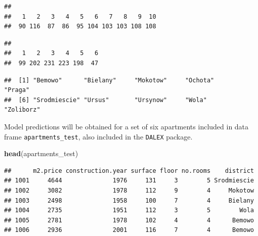 \documentclass[12pt,]{krantz}
\newenvironment{Shaded}{\begin{snugshade}}{\end{snugshade}}
\newcommand{\KeywordTok}[1]{\textcolor[rgb]{0.13,0.29,0.53}{\textbf{#1}}}
\newcommand{\NormalTok}[1]{#1}
\newcommand{\OperatorTok}[1]{\textcolor[rgb]{0.81,0.36,0.00}{\textbf{#1}}}
\theoremstyle{definition}
\theoremstyle{definition}
\theoremstyle{definition}
\theoremstyle{remark}
\begin{document}
\begin{Shaded}
\end{Shaded}

\begin{verbatim}
## 
##   1   2   3   4   5   6   7   8   9  10 
##  90 116  87  86  95 104 103 103 108 108
\end{verbatim}

\begin{Shaded}
\end{Shaded}

\begin{verbatim}
## 
##   1   2   3   4   5   6 
##  99 202 231 223 198  47
\end{verbatim}

\begin{Shaded}
\end{Shaded}

\begin{verbatim}
##  [1] "Bemowo"      "Bielany"     "Mokotow"     "Ochota"      "Praga"      
##  [6] "Srodmiescie" "Ursus"       "Ursynow"     "Wola"        "Zoliborz"
\end{verbatim}

Model predictions will be obtained for a set of six apartments included
in data frame \texttt{apartments\_test}, also included in the
\texttt{DALEX} package.

\begin{Shaded}
\begin{Highlighting}[]
\KeywordTok{head}\NormalTok{(apartments_test)}
\end{Highlighting}
\end{Shaded}

\begin{verbatim}
##      m2.price construction.year surface floor no.rooms    district
## 1001     4644              1976     131     3        5 Srodmiescie
## 1002     3082              1978     112     9        4     Mokotow
## 1003     2498              1958     100     7        4     Bielany
## 1004     2735              1951     112     3        5        Wola
## 1005     2781              1978     102     4        4      Bemowo
## 1006     2936              2001     116     7        4      Bemowo
\end{verbatim}
\end{document}
